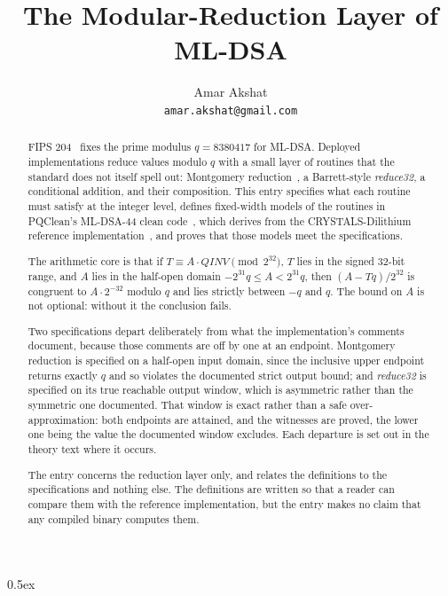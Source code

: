 \documentclass[11pt,a4paper]{article}
\begin{document}
\title{The Modular-Reduction Layer of ML-DSA}
\author{Amar Akshat \\ \texttt{amar.akshat@gmail.com}}
\maketitle

\begin{abstract}
FIPS 204~\cite{fips204} fixes the prime modulus $q = 8380417$ for ML-DSA. Deployed implementations
reduce values modulo $q$ with a small layer of routines that the standard does not itself spell out:
Montgomery reduction~\cite{montgomery1985}, a Barrett-style \emph{reduce32}, a conditional addition,
and their composition. This entry specifies what each routine must satisfy at the integer level,
defines fixed-width models of the routines in PQClean's ML-DSA-44 clean
code~\cite{pqclean_mldsa}, which derives from the CRYSTALS-Dilithium reference
implementation~\cite{dilithium_ref}, and proves that those models meet the specifications.

The arithmetic core is that if $T \equiv A \cdot \mathit{QINV} \pmod{2^{32}}$, $T$ lies in the
signed 32-bit range, and $A$ lies in the half-open domain $-2^{31}q \le A < 2^{31}q$, then
$(A - Tq)/2^{32}$ is congruent to $A \cdot 2^{-32}$ modulo $q$ and lies strictly between $-q$ and $q$.
The bound on $A$ is not optional: without it the conclusion fails.

Two specifications depart deliberately from what the implementation's comments document, because those
comments are off by one at an endpoint. Montgomery reduction is specified on a half-open input domain,
since the inclusive upper endpoint returns exactly $q$ and so violates the documented strict output
bound; and \emph{reduce32} is specified on its true reachable output window, which is asymmetric
rather than the symmetric one documented. That window is exact rather than a safe over-approximation:
both endpoints are attained, and the witnesses are proved, the lower one being the value the documented
window excludes. Each departure is set out in the theory text where it occurs.

The entry concerns the reduction layer only, and relates the definitions to the specifications and
nothing else. The definitions are written so that a reader can compare them with the reference
implementation, but the entry makes no claim that any compiled binary computes them.
\end{abstract}

\tableofcontents

\parindent 0pt\parskip 0.5ex





\end{document}
